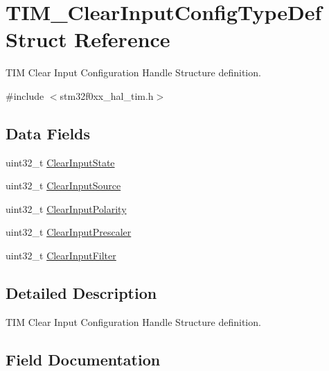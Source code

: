 \hypertarget{struct_t_i_m___clear_input_config_type_def}{}\section{T\+I\+M\+\_\+\+Clear\+Input\+Config\+Type\+Def Struct Reference}
\label{struct_t_i_m___clear_input_config_type_def}


T\+IM Clear Input Configuration Handle Structure definition.  




{\ttfamily \#include $<$stm32f0xx\+\_\+hal\+\_\+tim.\+h$>$}

\subsection*{Data Fields}
\begin{DoxyCompactItemize}
\item 
uint32\+\_\+t \hyperlink{struct_t_i_m___clear_input_config_type_def_ae375822fd9a07ebafaf13fc47db211db}{Clear\+Input\+State}
\item 
uint32\+\_\+t \hyperlink{struct_t_i_m___clear_input_config_type_def_a53908db365bf0aa50a9217dcee98b61c}{Clear\+Input\+Source}
\item 
uint32\+\_\+t \hyperlink{struct_t_i_m___clear_input_config_type_def_a952f89c595fc06fe7e0ad41f8992fda2}{Clear\+Input\+Polarity}
\item 
uint32\+\_\+t \hyperlink{struct_t_i_m___clear_input_config_type_def_a177e485feed1a56dbb578aa11f758c79}{Clear\+Input\+Prescaler}
\item 
uint32\+\_\+t \hyperlink{struct_t_i_m___clear_input_config_type_def_a79dfd4545a2fa8ca202bf0e80374db66}{Clear\+Input\+Filter}
\end{DoxyCompactItemize}


\subsection{Detailed Description}
T\+IM Clear Input Configuration Handle Structure definition. 

\subsection{Field Documentation}
\mbox{\label{struct_t_i_m___clear_input_config_type_def_a79dfd4545a2fa8ca202bf0e80374db66}} 
